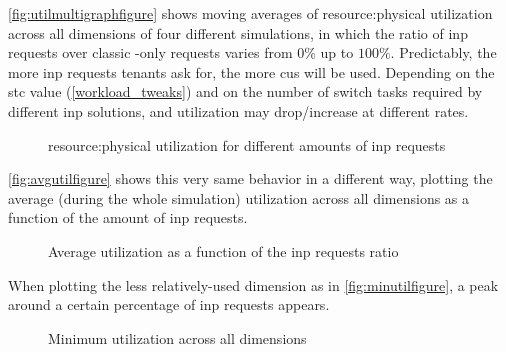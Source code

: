 \autoref{fig:utilmultigraphfigure} shows moving averages of \gls{resource:physical} utilization across all dimensions of four different simulations, in which the ratio of \gls{inp} requests over classic -only requests varies from $0\%$ up to $100\%$.
Predictably, the more \gls{inp} requests tenants ask for, the more \glspl{cu} will be used.
Depending on the \gls{stc} value (\autoref{workload_tweaks}) and on the number of switch tasks required by different \gls{inp} solutions,  and  utilization may drop/increase at different rates.
\begin{figure}[!htb]
    \centering
    \usebox{\utilmultigraphfigure}
    \caption{\Gls{resource:physical} utilization for different amounts of \gls{inp} requests}
    \label{fig:utilmultigraphfigure}
\end{figure}

\autoref{fig:avgutilfigure} shows this very same behavior in a different way, plotting the average (during the whole simulation)  utilization across all dimensions as a function of the amount of \gls{inp} requests.
\begin{figure}[!htb]
    \centering
    \usebox{\avgutilfigure}
    \caption{Average  utilization as a function of the \gls{inp} requests ratio}
    \label{fig:avgutilfigure}
\end{figure}

When plotting the less relatively-used  dimension as in \autoref{fig:minutilfigure}, a peak around a certain percentage of \gls{inp} requests appears.
\begin{figure}[!htb]
    \centering
    \usebox{\minutilfigure}
    \caption{Minimum  utilization across all dimensions}
    \label{fig:minutilfigure}
\end{figure}

